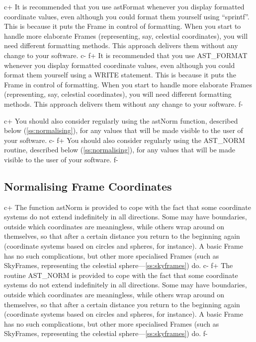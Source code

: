 \documentclass[twoside,11pt]{article}
\newcommand{\secref}[1]{\S\ref{#1}}
\renewcommand{\secref}[1]{\ref{#1}}
\begin{document}
c+
It is recommended that you use astFormat whenever you display
formatted coordinate values, even although you could format them
yourself using ``sprintf''. This is because it puts the Frame in
control of formatting. When you start to handle more elaborate Frames
(representing, say, celestial coordinates), you will need different
formatting methods. This approach delivers them without any change to
your software.
c-
f+
It is recommended that you use AST\_FORMAT whenever you display
formatted coordinate values, even although you could format them
yourself using a WRITE statement. This is because it puts the Frame in
control of formatting. When you start to handle more elaborate Frames
(representing, say, celestial coordinates), you will need different
formatting methods. This approach delivers them without any change to
your software.
f-

c+
You should also consider regularly using the astNorm function,
described below (\secref{ss:normalising}), for any values that will be
made visible to the user of your software.
c-
f+
You should also consider regularly using the AST\_NORM routine,
described below (\secref{ss:normalising}), for any values that will be
made visible to the user of your software.
f-

\subsection{\label{ss:normalising}Normalising Frame Coordinates}

c+
The function astNorm is provided to cope with the fact that some
coordinate systems do not extend indefinitely in all directions. Some
may have boundaries, outside which coordinates are meaningless, while
others wrap around on themselves, so that after a certain distance you
return to the beginning again (coordinate systems based on circles and
spheres, for instance). A basic Frame has no such complications, but
other more specialised Frames (such as SkyFrames, representing the
celestial sphere---\secref{ss:skyframes}) do.
c-
f+
The routine AST\_NORM is provided to cope with the fact that some
coordinate systems do not extend indefinitely in all directions. Some
may have boundaries, outside which coordinates are meaningless, while
others wrap around on themselves, so that after a certain distance you
return to the beginning again (coordinate systems based on circles and
spheres, for instance). A basic Frame has no such complications, but
other more specialised Frames (such as SkyFrames, representing the
celestial sphere---\secref{ss:skyframes}) do.
f-
\end{document}
